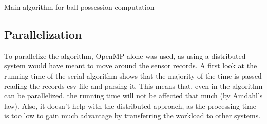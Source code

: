 \documentclass[a4paper, 10pt]{article}
\begin{document}
\begin{algorithm}[tb]

    \BlankLine
    \caption{Main algorithm for ball possession computation}
    \label{algorithm:main_loops}
\end{algorithm}

\subsection*{Parallelization}

To parallelize the algorithm, OpenMP alone was used, as using a distributed system would have meant to move around the sensor records.
A first look at the running time of the serial algorithm shows that the majority of the time is passed reading the records csv file and parsing it.
This means that, even in the algorithm can be parallelized, the running time will not be affected that much (by Amdahl's law).
Also, it doesn't help with the distributed approach, as the processing time is too low to gain much advantage by transferring the workload to other systems.
\end{document}
